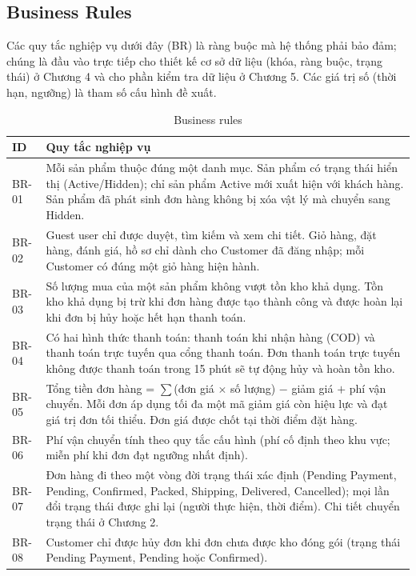 \documentclass[12pt,a4paper,oneside]{report}
\newif\ifmark \marktrue
\newenvironment{chgblock}{\ifmark\color{red}\fi}{}
\begin{document}
\begin{chgblock}
\subsection{Business Rules}

Các quy tắc nghiệp vụ dưới đây (BR) là ràng buộc mà hệ thống phải bảo đảm; chúng là đầu vào trực tiếp cho thiết kế cơ sở dữ liệu (khóa, ràng buộc, trạng thái) ở Chương 4 và cho phần kiểm tra dữ liệu ở Chương 5. Các giá trị số (thời hạn, ngưỡng) là tham số cấu hình đề xuất.

\begin{longtable}{p{1.4cm}p{14.4cm}}
\caption{Business rules}\\
\toprule
\textbf{ID} & \textbf{Quy tắc nghiệp vụ} \\
\midrule
\endhead
\bottomrule
\endlastfoot
BR-01 & Mỗi sản phẩm thuộc đúng một danh mục. Sản phẩm có trạng thái hiển thị (Active/Hidden); chỉ sản phẩm Active mới xuất hiện với khách hàng. Sản phẩm đã phát sinh đơn hàng không bị xóa vật lý mà chuyển sang Hidden. \\
BR-02 & Guest user chỉ được duyệt, tìm kiếm và xem chi tiết. Giỏ hàng, đặt hàng, đánh giá, hồ sơ chỉ dành cho Customer đã đăng nhập; mỗi Customer có đúng một giỏ hàng hiện hành. \\
BR-03 & Số lượng mua của một sản phẩm không vượt tồn kho khả dụng. Tồn kho khả dụng bị trừ khi đơn hàng được tạo thành công và được hoàn lại khi đơn bị hủy hoặc hết hạn thanh toán. \\
BR-04 & Có hai hình thức thanh toán: thanh toán khi nhận hàng (COD) và thanh toán trực tuyến qua cổng thanh toán. Đơn thanh toán trực tuyến không được thanh toán trong 15 phút sẽ tự động hủy và hoàn tồn kho. \\
BR-05 & Tổng tiền đơn hàng = $\sum$(đơn giá $\times$ số lượng) $-$ giảm giá $+$ phí vận chuyển. Mỗi đơn áp dụng tối đa một mã giảm giá còn hiệu lực và đạt giá trị đơn tối thiểu. Đơn giá được chốt tại thời điểm đặt hàng. \\
BR-06 & Phí vận chuyển tính theo quy tắc cấu hình (phí cố định theo khu vực; miễn phí khi đơn đạt ngưỡng nhất định). \\
BR-07 & Đơn hàng đi theo một vòng đời trạng thái xác định (Pending Payment, Pending, Confirmed, Packed, Shipping, Delivered, Cancelled); mọi lần đổi trạng thái được ghi lại (người thực hiện, thời điểm). Chi tiết chuyển trạng thái ở Chương 2. \\
BR-08 & Customer chỉ được hủy đơn khi đơn chưa được kho đóng gói (trạng thái Pending Payment, Pending hoặc Confirmed). \\

\end{longtable}
\end{chgblock}
\end{document}
